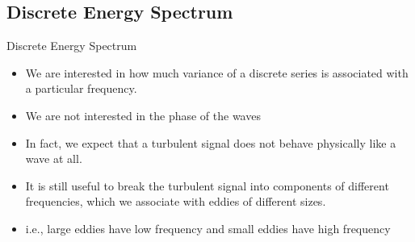 \subsection{Discrete Energy Spectrum} %
\begin{frame}{Discrete Energy Spectrum}
\begin{itemize}
	\item We are interested in how much variance of a discrete series is associated with a particular frequency.
	\item We are not interested in the phase of the waves
	\item In fact, we expect that a turbulent signal does not behave physically like a wave at all.
	\item It is still useful to break the turbulent signal into components of different frequencies, which we associate with eddies of different sizes.
	\item i.e., large eddies have low frequency and small eddies have high frequency
\end{itemize}
\end{frame}

